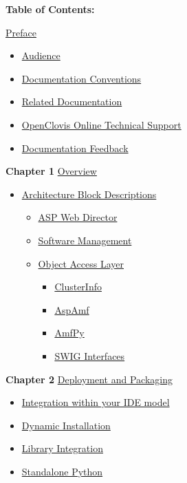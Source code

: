 \label{index_ardguide}
\hypertarget{index_ardguide}{}


{\bf Table of Contents: }

\hyperlink{ardguide_sec_0}{Preface}\begin{itemize}
\item \hyperlink{ardguide_sec_0_1}{Audience}\item \hyperlink{ardguide_sec_0_2}{Documentation Conventions}\item \hyperlink{ardguide_sec_0_3}{Related Documentation}\item \hyperlink{ardguide_sec_0_4}{OpenClovis Online Technical Support}\item \hyperlink{ardguide_sec_0_5}{Documentation Feedback}\end{itemize}


{\bf Chapter 1} \hyperlink{ardguide_sec_1}{Overview}\begin{itemize}
\item \hyperlink{ardguide_sec_1_1}{Architecture Block Descriptions}\begin{itemize}
\item \hyperlink{ardguide_sec_1_1_ardguide_sec_1_1_1}{ASP Web Director}\item \hyperlink{ardguide_sec_1_1_ardguide_sec_1_1_2}{Software Management}\item \hyperlink{ardguide_sec_1_1_ardguide_sec_1_1_3}{Object Access Layer}\begin{itemize}
\item \hyperlink{ardguide_sec_1_1_ardguide_sec_1_1_3_1}{ClusterInfo}\item \hyperlink{ardguide_sec_1_1_ardguide_sec_1_1_3_2}{AspAmf}\item \hyperlink{ardguide_sec_1_1_ardguide_sec_1_1_3_3}{AmfPy}\item \hyperlink{ardguide_sec_1_1_ardguide_sec_1_1_3_4}{SWIG Interfaces}\end{itemize}
\end{itemize}
\end{itemize}


{\bf Chapter 2} \hyperlink{ardguide_sec_2}{Deployment and Packaging}\begin{itemize}
\item \hyperlink{ardguide_sec_2_1}{Integration within your IDE model}\item \hyperlink{ardguide_sec_2_2}{Dynamic Installation}\item \hyperlink{ardguide_sec_2_3}{Library Integration}\item \hyperlink{ardguide_sec_2_4}{Standalone Python}\end{itemize}



